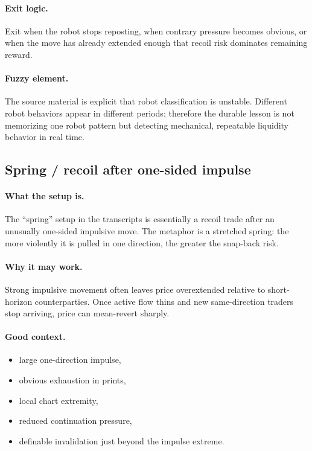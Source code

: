 \paragraph{Exit logic.} Exit when the robot stops reposting, when contrary pressure becomes obvious, or when the move has already extended enough that recoil risk dominates remaining reward.

\paragraph{Fuzzy element.} The source material is explicit that robot classification is unstable. Different robot behaviors appear in different periods; therefore the durable lesson is not memorizing one robot pattern but detecting mechanical, repeatable liquidity behavior in real time.


\subsection{Spring / recoil after one-sided impulse}

\paragraph{What the setup is.} The ``spring'' setup in the transcripts is essentially a recoil trade after an unusually one-sided impulsive move. The metaphor is a stretched spring: the more violently it is pulled in one direction, the greater the snap-back risk.

\paragraph{Why it may work.} Strong impulsive movement often leaves price overextended relative to short-horizon counterparties. Once active flow thins and new same-direction traders stop arriving, price can mean-revert sharply.

\paragraph{Good context.}
\begin{itemize}
\item large one-direction impulse,
\item obvious exhaustion in prints,
\item local chart extremity,
\item reduced continuation pressure,
\item definable invalidation just beyond the impulse extreme.
\end{itemize}


